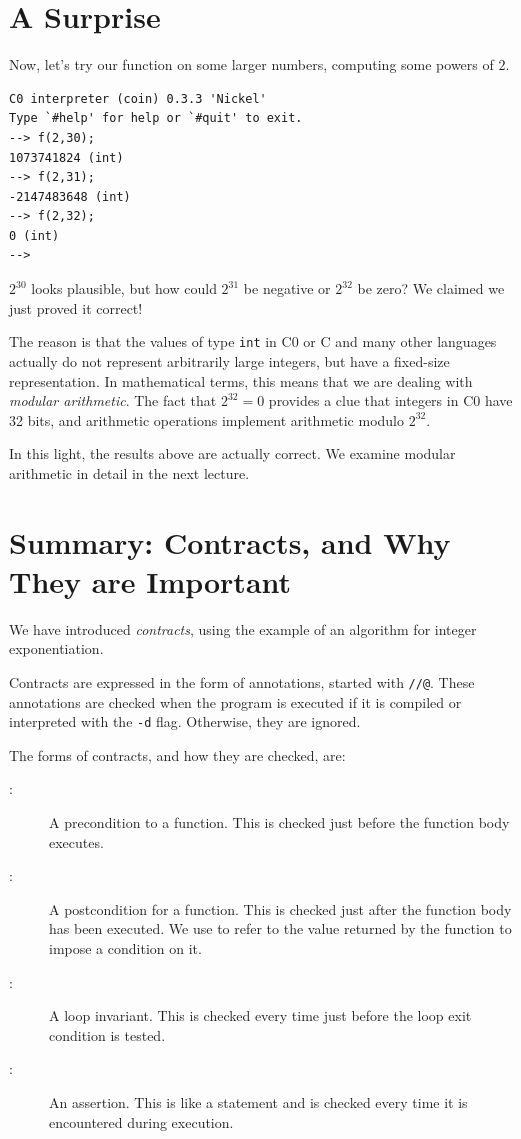 \clearpage
\section{A Surprise}
\label{sec:contracts:overflow}

Now, let's try our function on some larger numbers, computing
some powers of $2$.
\begin{lstlisting}[language={[coin]C}]
% coin mystery2f.c0 -d
C0 interpreter (coin) 0.3.3 'Nickel'
Type `#help' for help or `#quit' to exit.
--> f(2,30);
1073741824 (int)
--> f(2,31);
-2147483648 (int)
--> f(2,32);
0 (int)
-->
\end{lstlisting}
$2^{30}$ looks plausible, but how could $2^{31}$ be negative or
$2^{32}$ be zero?  We claimed we just proved it correct!

The reason is that the values of type \lstinline'int' in C0 or C and
many other languages actually do not represent arbitrarily large
integers, but have a fixed-size representation.  In mathematical
terms, this means that we are dealing with \emph{modular arithmetic}.
The fact that $2^{32} = 0$ provides a clue that integers in C0 have 32
bits, and arithmetic operations implement arithmetic modulo $2^{32}$.

In this light, the results above are actually correct.  We examine
modular arithmetic in detail in the next lecture.


\clearpage
\section{Summary: Contracts, and Why They are Important}
\label{sec:contracts:summary}

We have introduced \emph{contracts}, using the example of
an algorithm for integer exponentiation.

Contracts are expressed in the form of annotations, started with
\lstinline'//@'.  These annotations are checked when the program is
executed if it is compiled or interpreted with the \lstinline'-d' flag.
Otherwise, they are ignored.

The forms of contracts, and how they are checked, are:
\begin{description}
\item[\requires:] %
  A precondition to a function.  This is checked just before the function body
  executes.
\item[\ensures:] %
  A postcondition for a function.  This is checked just after the function
  body has been executed.  We use \result{} to refer to the value
  returned by the function to impose a condition on it.
\item[\loopinvariant:] %
  A loop invariant.  This is checked every time just before the loop exit
  condition is tested.
\item[\assert:] %
  An assertion.  This is like a statement and is checked every time it is
  encountered during execution.
\end{description}

